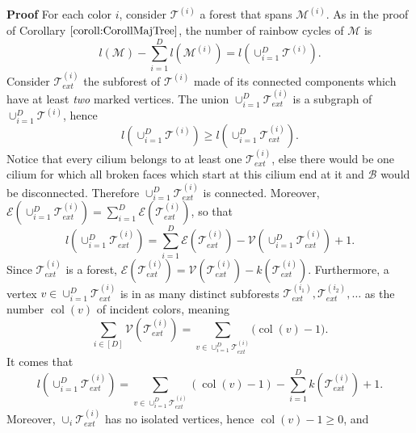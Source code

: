 \documentclass[aps,prd,10pt,notitlepage,nofootinbib,superscriptaddress,showkeys,showpacs]{revtex4-1}
\begin{document}
{{\noindent \bf Proof\; \; }} For each color $i$, consider ${\mathcal{T}}^{(i)}$ a forest that spans ${\mathcal{M}}^{(i)}$. As in the proof of Corollary $ \ref{coroll:CorollMajTree}$, the number of rainbow cycles of ${\mathcal{M}}$ is
\begin{equation}
l({\mathcal{M}})-\sum_{i=1}^Dl({\mathcal{M}}^{(i)})=l(\cup_{i=1}^D{\mathcal{T}}^{(i)}).
\end{equation}
Consider ${\mathcal{T}}_{ext}^{(i)}$ the subforest of ${\mathcal{T}}^{(i)}$ made of its connected components which have at least {\it two} marked vertices. The union $\cup_{i=1}^D{\mathcal{T}}_{ext}^{(i)}$ is a subgraph of $\cup_{i=1}^D{\mathcal{T}}^{(i)}$, hence
\begin{equation}
l(\cup_{i=1}^D{\mathcal{T}}^{(i)})\ge l(\cup_{i=1}^D{\mathcal{T}}_{ext}^{(i)}).
\end{equation}
Notice that every cilium belongs to at least one ${\mathcal{T}}_{ext}^{(i)}$, else there would be one cilium for which all broken faces which start at this cilium end at it and ${\mathcal{B}}$ would be disconnected. Therefore $\cup_{i=1}^D{\mathcal{T}}_{ext}^{(i)}$ is connected. Moreover, ${\mathcal{E}}(\cup_{i=1}^D{\mathcal{T}}_{ext}^{(i)})=\sum_{i=1}^D{\mathcal{E}}({\mathcal{T}}_{ext}^{(i)})$, so that
\begin{equation}
l(\cup_{i=1}^D{\mathcal{T}}_{ext}^{(i)})=\sum_{i=1}^D{\mathcal{E}}({\mathcal{T}}_{ext}^{(i)})-{\mathcal{V}}(\cup_{i=1}^D{\mathcal{T}}_{ext}^{(i)})+1.
\end{equation}
Since ${\mathcal{T}}_{ext}^{(i)}$ is a forest, ${\mathcal{E}}({\mathcal{T}}_{ext}^{(i)})={\mathcal{V}}({\mathcal{T}}_{ext}^{(i)})-k({\mathcal{T}}_{ext}^{(i)})$. Furthermore, a vertex $v\in\cup_{i=1}^D {\mathcal{T}}_{ext}^{(i)}$ is in as many distinct subforests ${\mathcal{T}}_{ext}^{(i_1)}, {\mathcal{T}}_{ext}^{(i_2)}, \dotsc$ as the number $\operatorname{col}(v)$ of incident colors, meaning
\begin{equation}
\sum_{i\in[D]} {\mathcal{V}}({\mathcal{T}}_{ext}^{(i)}) = \sum_{v\in \cup_{i=1}^D{\mathcal{T}}_{ext}^{(i)}} \bigl(\operatorname{col}(v)-1\bigr).
\end{equation}
It comes that
\begin{equation}
\label{eqref:CyclExt}
l(\cup_{i=1}^D{\mathcal{T}}_{ext}^{(i)})
=\sum_{v\in\cup_{i=1}^D{\mathcal{T}}_{ext}^{(i)}}(\operatorname{col}(v)-1)-\sum_{i=1}^Dk({\mathcal{T}}_{ext}^{(i)})+1.
\end{equation}
Moreover, $\cup_i{\mathcal{T}}_{ext}^{(i)}$ has no isolated vertices, hence $\operatorname{col}(v)-1\ge0$, and
\end{document}

